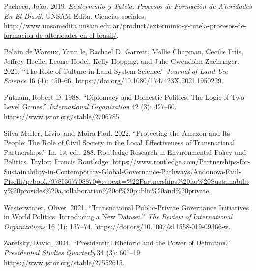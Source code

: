 \documentclass[
]{article}
\newlength{\cslhangindent}
\newlength{\cslentryspacingunit} %
\newenvironment{CSLReferences}[2] %
 {%
  \setlength{\parindent}{0pt}
  \ifodd #1
  \let\oldpar\par
  \def\par{\hangindent=\cslhangindent\oldpar}
  \fi
  \setlength{\parskip}{#2\cslentryspacingunit}
 }%
 {}
\begin{document}
\begin{CSLReferences}{1}{0}
\leavevmode{}%
Pacheco, João. 2019. \emph{Ecxterminio y Tutela: Procesos de Formación
de Alteridades En El Brasil}. UNSAM Edita. Ciencias sociales.
\url{http://www.unsamedita.unsam.edu.ar/product/exterminio-y-tutela-procesos-de-formacion-de-alteridades-en-el-brasil/}.

\leavevmode{}%
Polain de Waroux, Yann le, Rachael D. Garrett, Mollie Chapman, Cecilie
Friis, Jeffrey Hoelle, Leonie Hodel, Kelly Hopping, and Julie Gwendolin
Zaehringer. 2021. {``The Role of Culture in Land System Science.''}
\emph{Journal of Land Use Science} 16 (4): 450--66.
\url{https://doi.org/10.1080/1747423X.2021.1950229}.

\leavevmode{}%
Putnam, Robert D. 1988. {``Diplomacy and Domestic Politics: The Logic of
Two-Level Games.''} \emph{International Organization} 42 (3): 427--60.
\url{https://www.jstor.org/stable/2706785}.

\leavevmode{}%
Silva-Muller, Livio, and Moira Faul. 2022. {``Protecting the Amazon and
Its People: The Role of Civil Society in the Local Effectiveness of
Transnational Partnerships.''} In, 1st ed., 288. Routledge Research in
Environmental Policy and Politics. Taylor; Francis Routledge.
\url{https://www.routledge.com/Partnerships-for-Sustainability-in-Contemporary-Global-Governance-Pathways/Andonova-Faul-Piselli/p/book/9780367708870\#:~:text=\%22Partnerships\%20for\%20Sustainability\%20provides\%20a,collaboration\%20of\%20public\%20and\%20private.}

\leavevmode{}%
Westerwinter, Oliver. 2021. {``Transnational Public-Private Governance
Initiatives in World Politics: Introducing a New Dataset.''} \emph{The
Review of International Organizations} 16 (1): 137--74.
\url{https://doi.org/10.1007/s11558-019-09366-w}.

\leavevmode{}%
Zarefsky, David. 2004. {``Presidential Rhetoric and the Power of
Definition.''} \emph{Presidential Studies Quarterly} 34 (3): 607--19.
\url{https://www.jstor.org/stable/27552615}.

\end{CSLReferences}
\end{document}
